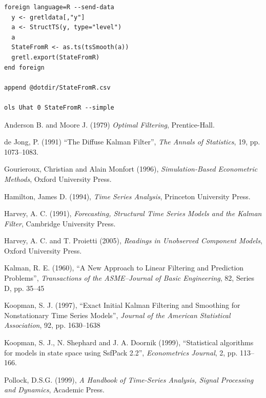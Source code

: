 \documentclass[a4paper]{article}
\begin{document}
\begin{verbatim}
foreign language=R --send-data
  y <- gretldata[,"y"]
  a <- StructTS(y, type="level")
  a
  StateFromR <- as.ts(tsSmooth(a))
  gretl.export(StateFromR)
end foreign

append @dotdir/StateFromR.csv

ols Uhat 0 StateFromR --simple
\end{verbatim}


\begin{thebibliography}

  Anderson B. and Moore J. (1979) \emph{Optimal Filtering}, Prentice-Hall.

  de Jong, P. (1991) ``The Diffuse Kalman Filter'', \emph{The Annals
    of Statistics}, 19, pp. 1073--1083.

  Gourieroux, Christian and Alain Monfort (1996),
  \emph{Simulation-Based Econometric Methods}, Oxford University
  Press.

  Hamilton, James D. (1994), \emph{Time Series Analysis}, Princeton
  University Press.

  Harvey, A. C. (1991), \emph{Forecasting, Structural Time Series
    Models and the Kalman Filter}, Cambridge University Press.

  Harvey, A. C. and T. Proietti (2005), \emph{Readings in Unobserved
    Component Models}, Oxford University Press.

  Kalman, R. E. (1960), ``A New Approach to Linear Filtering and
  Prediction Problems'', \emph{Transactions of the ASME--Journal of
    Basic Engineering}, 82, Series D, pp. 35--45

  Koopman, S. J. (1997), ``Exact Initial Kalman Filtering and
  Smoothing for Nonstationary Time Series Models'', \emph{Journal of
    the American Statistical Association}, 92, pp. 1630--1638

  Koopman, S. J., N. Shephard and J. A. Doornik (1999), 
  ``Statistical algorithms for models in state space using SsfPack
  2.2'', \emph{Econometrics Journal}, 2, pp. 113--166.
  
  Pollock, D.S.G. (1999), \emph{A Handbook of Time-Series Analysis,
    Signal Processing and Dynamics}, Academic Press.

\end{thebibliography}
\end{document}
